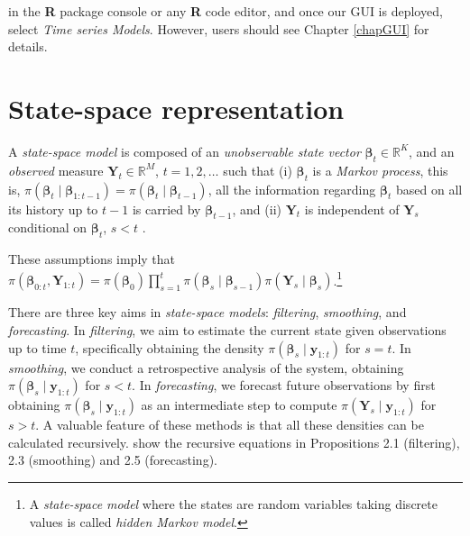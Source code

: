 in the \textbf{R} package console or any \textbf{R} code editor, and once our GUI is deployed, select \textit{Time series Models}. However, users should see Chapter \ref{chapGUI} for details.

\section{State-space representation}\label{sec81}
A \textit{state-space model} is composed of an \textit{unobservable state vector}  $\bm{\beta}_t \in \mathbb{R}^K$, and an \textit{observed} measure $\bm{Y}_t \in \mathbb{R}^M$, $t=1,2,\dots$ such that (i) $\bm{\beta}_t$ is a \textit{Markov process}, this is, $\pi(\bm{\beta}_t\mid \bm{\beta}_{1:t-1})=\pi(\bm{\beta}_t\mid \bm{\beta}_{t-1})$, all the information regarding $\bm{\beta}_t$ based on all its history up to $t-1$ is carried by $\bm{\beta}_{t-1}$, and (ii) $\bm{Y}_t$ is independent of $\bm{Y}_s$ conditional on $\bm{\beta}_t$, $s < t$ \cite[Chap.~2]{petris2009dynamic}.

These assumptions imply that $\pi(\bm{\beta}_{0:t},\bm{Y}_{1:t})=\pi(\bm{\beta}_0)\prod_{s=1}^{t}\pi(\bm{\beta}_s\mid \bm{\beta}_{s-1})\pi(\bm{Y}_s\mid \bm{\beta}_s)$.\footnote{A \textit{state-space model} where the states are random variables taking discrete values is called \textit{hidden Markov model}.}

There are three key aims in \textit{state-space models}: \textit{filtering}, \textit{smoothing}, and \textit{forecasting}. In \textit{filtering}, we aim to estimate the current state given observations up to time $t$, specifically obtaining the density $\pi(\bm{\beta}_{s}\mid \bm{y}_{1:t})$ for $s = t$. In \textit{smoothing}, we conduct a retrospective analysis of the system, obtaining $\pi(\bm{\beta}_{s}\mid \bm{y}_{1:t})$ for $s < t$. In \textit{forecasting}, we forecast future observations by first obtaining $\pi(\bm{\beta}_{s}\mid \bm{y}_{1:t})$ as an intermediate step to compute $\pi(\bm{Y}_{s}\mid \bm{y}_{1:t})$ for $s > t$. A valuable feature of these methods is that all these densities can be calculated recursively. \cite{petris2009dynamic} show the recursive equations in Propositions 2.1 (filtering), 2.3 (smoothing) and 2.5 (forecasting).

